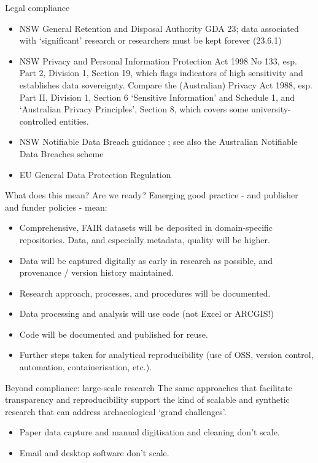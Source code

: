 \documentclass[aspectratio=169, 12pt]{beamer} %
\begin{document}
\begin{frame}{Legal compliance}
    \begin{itemize}[label=\textbullet]
        \item NSW General Retention and Disposal Authority GDA 23; data associated with `significant' research or researchers must be kept forever (23.6.1) \cite{Nsw2015-kv}
        \item NSW Privacy and Personal Information Protection Act 1998 No 133, esp. Part 2, Division 1, Section 19, which flags indicators of high sensitivity and establishes data sovereignty.\cite{Nsw1998-mw} Compare the (Australian) Privacy Act 1988, esp. Part II, Division 1, Section 6 `Sensitive Information' and Schedule 1, and `Australian Privacy Principles', Section 8, which covers some university-controlled entities. \cite{Ag2017-oz,Oaic2019-ng}
        \item NSW Notifiable Data Breach guidance \cite{Ipc_nsw2018-yr}; see also the Australian Notifiable Data Breaches scheme \cite{Oaic2019-dq}
        \item EU General Data Protection Regulation \cite{Gdpr2019-ee}
    \end{itemize}
\end{frame}

\begin{frame}{What does this mean? Are we ready?}
  Emerging good practice - and publisher and funder policies - mean:
    \begin{itemize}[label=\textbullet]
        \item Comprehensive, FAIR datasets will be deposited in domain-specific repositories. Data, and especially metadata, quality will be higher.
        \item Data will be captured digitally as early in research as possible, and provenance / version history maintained.
        \item Research approach, processes, and procedures will be documented.
        \item Data processing and analysis will use code (not Excel or ARCGIS!) 
        \item Code will be documented and published for reuse.
        \item Further steps taken for analytical reproducibility (use of OSS, version control, automation, containerisation, etc.). 
    \end{itemize}
\end{frame}

\begin{frame}{Beyond compliance: large-scale research}
    The same approaches that facilitate transparency and reproducibility support the kind of scalable and synthetic research that can address archaeological `grand challenges'. \cite{Kintigh2014-ub}
        \begin{itemize}[label=\textbullet]
            \item Paper data capture and manual digitisation and cleaning don't scale.
            \item Email and desktop software don't scale.
    \end{itemize}
\end{frame}
\end{document}
